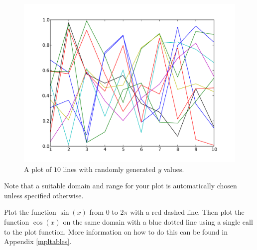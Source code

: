 \begin{figure}
\includegraphics[width=\textwidth]{statemachine.pdf}
\caption{A plot of $10$ lines with randomly generated $y$ values.}
\label{mpl:statemachineexample} 
\end{figure}

Note that a suitable domain and range for your plot is automatically chosen 
unless specified otherwise. 

\begin{problem} Plot the function $\sin(x)$ from $0$ to $2\pi$ with a red dashed line. Then plot the function $\cos(x)$ on the same domain with a blue dotted line using a single call to the plot function. More information on how to do this can be found in Appendix \ref{mpltables}. 
\end{problem}



